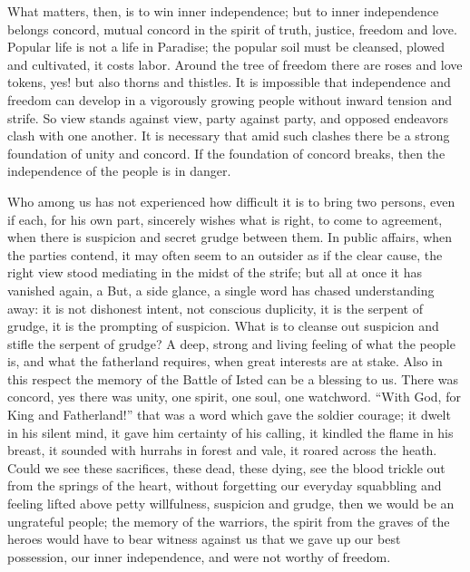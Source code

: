 \documentclass[12pt,a4paper,openany]{book}
\newcommand{\opage}[1]{\marginnote{\footnotesize\textit{[#1]}}}
\begin{document}
What matters, then, is to win inner independence;
but to inner independence belongs concord,
mutual concord in the spirit of truth, justice, freedom
and love. Popular life is not a life in
Paradise; the popular soil must be cleansed, plowed
and cultivated, it costs labor. Around the tree of freedom
there are roses and love tokens, yes! but also thorns and
thistles. It is impossible that independence and freedom
can develop in a vigorously growing people without
inward tension and strife. So view stands against
view, party against party, and opposed endeavors clash
\setcounter{footnote}{0}%
\opage{159}with one another. It is necessary that amid such
clashes there be a strong foundation of unity and concord.
If the foundation of concord breaks, then the independence of the people
is in danger.

Who among us has not experienced how difficult
it is to bring two persons, even if each, for his own part,
sincerely wishes what is right, to come to agreement,
when there is suspicion and secret grudge between them.
In public affairs, when the parties contend, it may
often seem to an outsider as if the clear
cause, the right view stood mediating in the midst of the strife;
but all at once it has vanished again, a But, a side glance,
a single word has chased understanding away: it is not
dishonest intent, not conscious duplicity, it is
the serpent of grudge, it is the prompting of suspicion. What
is to cleanse out suspicion and stifle the serpent of grudge? A
deep, strong and living feeling of what the people is,
and what the fatherland requires, when great interests
are at stake. Also in this respect the memory
of the Battle of Isted can be a blessing to us. There was concord,
yes there was unity, one spirit, one soul, one
watchword. ``With God, for King and Fatherland!'' that was
a word which gave the soldier courage; it dwelt in his silent
mind, it gave him certainty of his calling, it kindled
the flame in his breast, it sounded with hurrahs in forest and
vale, it roared across the heath. Could we see
these sacrifices, these dead, these dying, see the blood trickle
out from the springs of the heart, without forgetting our everyday squabbling
and feeling lifted above petty willfulness,
suspicion and grudge, then we would be an ungrateful people;
the memory of the warriors, the spirit from the graves of the heroes would have to
\setcounter{footnote}{0}%
\opage{160}bear witness against us that we gave up our best possession, our inner
independence, and were not worthy of freedom.
\end{document}
